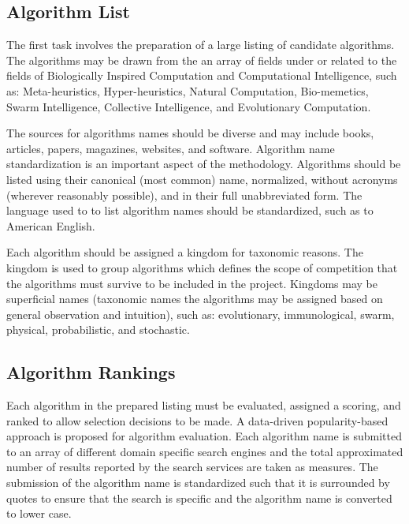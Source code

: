 \documentclass[a4paper, 11pt]{article}
\begin{document}
% 
% 
\subsection{Algorithm List}
The first task involves the preparation of a large listing of candidate algorithms. The algorithms may be drawn from the an array of fields under or related to the fields of Biologically Inspired Computation and Computational Intelligence, such as: Meta-heuristics, Hyper-heuristics, Natural Computation, Bio-memetics, Swarm Intelligence, Collective Intelligence, and Evolutionary Computation.

The sources for algorithms names should be diverse and may include books, articles, papers, magazines, websites, and software. Algorithm name standardization is an important aspect of the methodology. Algorithms should be listed using their canonical (most common) name, normalized, without acronyms (wherever reasonably possible), and in their full unabbreviated form. The language used to to list algorithm names should be standardized, such as to American English.

Each algorithm should be assigned a kingdom for taxonomic reasons. The kingdom is used to group algorithms which defines the scope of competition that the algorithms must survive to be included in the project. Kingdoms may be superficial names (taxonomic names the algorithms may be assigned based on general observation and intuition), such as: evolutionary, immunological, swarm, physical, probabilistic, and stochastic.

% 
% 
\subsection{Algorithm Rankings}
Each algorithm in the prepared listing must be evaluated, assigned a scoring, and ranked to allow selection decisions to be made. A data-driven popularity-based approach is proposed for algorithm evaluation. Each algorithm name is submitted to an array of different domain specific search engines and the total approximated number of results reported by the search services are taken as measures. The submission of the algorithm name is standardized such that it is surrounded by quotes to ensure that the search is specific and the algorithm name is converted to lower case. 
\end{document}

